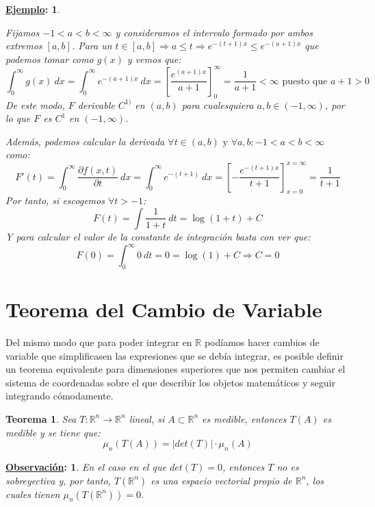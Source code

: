 \documentclass[10pt,a4paper,openright]{book}
\theoremstyle{break}
\newtheorem*{theo}{Teorema}
\newtheorem*{obs}{\underline{Observación}:}
\newtheorem*{ej}{\underline{Ejemplo}:}
\newcommand{\dif}[1]{\ d#1}
\begin{document}
\begin{ej}
\begin{enumerate}
    Fijamos $-1 < a < b < \infty$ y consideramos el intervalo formado por ambos extremos $\left[a, b\right]$. Para un $t \in \left[a, b\right] \Rightarrow a \le t \Rightarrow e^{-\left(t+1\right)x} \le e^{-\left(a+1\right)x}$ que podemos tomar como $g \left(x\right)$ y vemos que:
    $$\int_0^{\infty} g \left(x\right) \dif{x} = \int_0^{\infty} e^{-\left(a+1\right)x} \dif{x} =  \left[\frac{e^{\left(a+1\right)x}}{a+1}\right]_{0}^{\infty} = \frac{1}{a+1} < \infty \text{ puesto que } a+1>0$$
    De este modo, $F$ derivable $C^{1)}$ en $\left(a, b\right)$ para cualesquiera $a,b \in (-1, \infty)$, por lo que $ F$ es $C^1$ en $ \left(-1, \infty\right)$.

    Además, podemos calcular la derivada $\forall t \in \left(a, b\right)\mbox{ y } \forall a, b : -1 < a < b < \infty$ como:
    $$F' \left(t\right) = \int_0^{\infty} \frac{\partial f\left(x, t\right)}{\partial t}  \dif{x} = \int_0^{\infty} e^{-\left(t + 1\right)} \dif{x} = \left[-\frac{e^{- \left(t + 1\right)x}}{t+1}\right]_{x = 0}^{x = \infty} = \frac{1}{t + 1}$$
    Por tanto, si escogemos $\forall t > -1$:
    $$F \left(t\right) = \int \frac{1}{1 + t} \dif{t} = \log \left(1 + t\right) + C$$
    Y para calcular el valor de la constante de integración basta con ver que:
    $$F \left(0\right) = \int_0^{\infty} 0 \dif{t} = 0 = \log \left(1\right) + C\Rightarrow C = 0$$
\end{enumerate}
\end{ej}
 
\section{Teorema del Cambio de Variable}
Del mismo modo que para poder integrar en $\mathbb{R}$ podíamos hacer cambios de variable que simplificasen las expresiones que se debía integrar, es posible definir un teorema equivalente para dimensiones superiores que nos permiten cambiar el sistema de coordenadas sobre el que describir los objetos matemáticos y seguir integrando cómodamente.

\begin{theo}
Sea $T: \mathbb{R}^n \rightarrow \mathbb{R}^n$ lineal, si $A \subset \mathbb{R}^n$ es medible, entonces $T \left( A\right)$ es medible y se tiene que:
$$\mu_n \left(T\left(A\right)\right) = \lvert det \left(T\right) \rvert \cdot \mu_n \left(A\right)$$
\end{theo}

\begin{obs}
En el caso en el que $det \left(T\right) = 0$, entonces $T$ no es sobreyectiva y, por tanto, $T \left(\mathbb{R}^n\right)$ es una espacio vectorial propio de $\mathbb{R}^n$, los cuales tienen $\mu_n \left(T \left(\mathbb{R}^n\right)\right) = 0$.
\end{obs}
\end{document}
